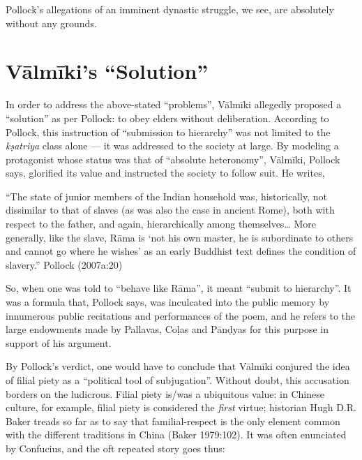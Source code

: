 Pollock’s allegations of an imminent dynastic struggle, we see, are absolutely without any grounds. 

\section{Vālmīki’s “Solution”}\label{sec1.3}

In order to address the above-stated “problems”, Vālmīki allegedly proposed a “solution” as per Pollock: to obey elders without deliberation. According to Pollock, this instruction of “submission to hierarchy” was not limited to the {\sl kṣatriya} class alone --- it was addressed to the society at large. By modeling a protagonist whose status was that of “absolute heteronomy”, Vālmīki, Pollock says, glorified its value and instructed the society to follow suit. He writes,

\begin{myquote}
“The state of junior members of the Indian household was, historically, not dissimilar to that of slaves (as was also the case in ancient Rome), both with respect to the father, and again, hierarchically among themselves… More generally, like the slave, Rāma is ‘not his own master, he is subordinate to others and cannot go where he wishes’ as an early Buddhist text defines the condition of slavery.” 				                                        
\hfill Pollock (2007a:20)
\end{myquote}

\newpage

So, when one was told to “behave like Rāma”, it meant “submit to hierarchy”. It was a formula that, Pollock says, was inculcated into the public memory by innumerous public recitations and performances of the poem, and he refers to the large endowments made by Pallavas, Coḷas and Pānḍyas for this purpose in support of his argument.

By Pollock’s verdict, one would have to conclude that Vālmīki conjured the idea of filial piety as a “political tool of subjugation”. Without doubt, this accusation borders on the ludicrous. Filial piety is/was a ubiquitous value: in Chinese culture, for example, filial piety is considered the {\sl first} virtue; historian Hugh D.R. Baker treads so far as to say that familial-respect is the only element common with the different traditions in China (Baker 1979:102). It was often enunciated by Confucius, and the oft repeated story goes thus: 

